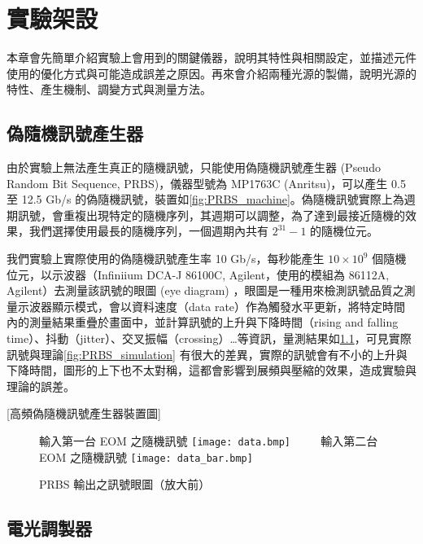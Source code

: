 \documentclass[class=NCU_thesis, crop=false]{standalone}
\begin{document}
\chapter{實驗架設}
本章會先簡單介紹實驗上會用到的關鍵儀器，說明其特性與相關設定，並描述元件使用的優化方式與可能造成誤差之原因。再來會介紹兩種光源的製備，說明光源的特性、產生機制、調變方式與測量方法。

\section{偽隨機訊號產生器}
由於實驗上無法產生真正的隨機訊號，只能使用偽隨機訊號產生器 (Pseudo Random Bit Sequence, PRBS)，儀器型號為 MP1763C (Anritsu)，可以產生 0.5 至 12.5 Gb/s 的偽隨機訊號，裝置如\cref{fig:PRBS_machine}。偽隨機訊號實際上為週期訊號，會重複出現特定的隨機序列，其週期可以調整，為了達到最接近隨機的效果，我們選擇使用最長的隨機序列，一個週期內共有 $2^{31}-1$ 的隨機位元。

我們實驗上實際使用的偽隨機訊號產生率 10 Gb/s，每秒能產生 $10\times 10^{9}$ 個隨機位元，以示波器（Infiniium DCA-J 86100C, Agilent，使用的模組為 86112A, Agilent）去測量該訊號的眼圖 (eye diagram) ，眼圖是一種用來檢測訊號品質之測量示波器顯示模式，會以資料速度（data rate）作為觸發水平更新，將特定時間內的測量結果重疊於畫面中，並計算訊號的上升與下降時間（rising and falling time）、抖動（jitter）、交叉振幅（crossing）\dots 等資訊，量測結果如\cref{fig:prbs_eye}，可見實際訊號與理論\cref{fig:PRBS_simulation} 有很大的差異，實際的訊號會有不小的上升與下降時間，圖形的上下也不太對稱，這都會影響到展頻與壓縮的效果，造成實驗與理論的誤差。

[高頻偽隨機訊號產生器裝置圖]


\begin{figure}[!hbt]
    \centering
    \subcaptionbox
        {輸入第一台 EOM 之隨機訊號
        \label{fig:subfig_fig1}}
        {\texttt{[image: data.bmp]}}
    ~~~~
    \subcaptionbox
        {輸入第二台 EOM 之隨機訊號
        \label{fig:subfig_fig2}}
        {\texttt{[image: data\_bar.bmp]}}
    \caption{PRBS 輸出之訊號眼圖（放大前）}
    \label{fig:prbs_eye}
\end{figure}

\section{電光調製器}
\end{document}
